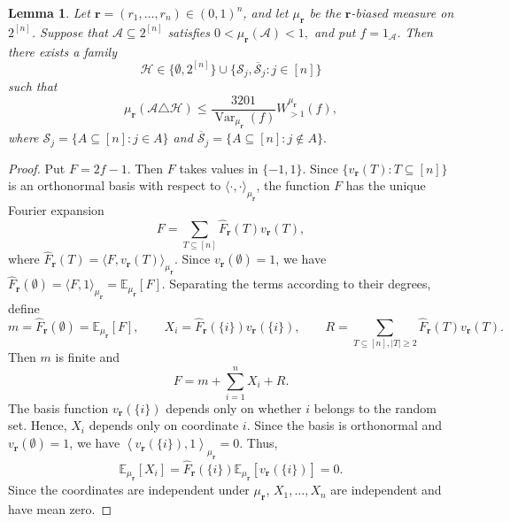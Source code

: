 \documentclass[11pt]{article}
\numberwithin{equation}{section}
\newtheorem{lemma}[theorem]{Lemma}
\theoremstyle{definition}
\theoremstyle{remark}
\begin{document}
\begin{lemma}\label{lem:one-coordinate-approximation}
Let $\mathbf r=(r_1,\ldots,r_n)\in(0,1)^n$, and let
$\mu_{\mathbf r}$ be the $\mathbf r$-biased measure on
$2^{[n]}$. Suppose that $\mathcal A\subseteq2^{[n]}$ satisfies
$
0<\mu_{\mathbf r}(\mathcal A)<1,
$
and put $f=1_{\mathcal A}$. Then there exists a family
$$
\mathcal H\in
\{\emptyset,2^{[n]}\}
\cup
\{\mathcal S_j,\overline{\mathcal S}_j:j\in[n]\}
$$
such that
$$
\mu_{\mathbf r}(\mathcal A\triangle\mathcal H)
\leq
\frac{3201}
{\operatorname{Var}_{\mu_{\mathbf r}}(f)}
W_{>1}^{\mu_{\mathbf r}}(f),
$$
where
$
\mathcal S_j=\{A\subseteq[n]:j\in A\}
$
and
$
\overline{\mathcal S}_j
=\{A\subseteq[n]:j\notin A\}.
$
\end{lemma}

\begin{proof}
Put
$
F=2f-1.
$
Then $F$ takes values in $\{-1,1\}$. Since
$
\{v_{\mathbf r}(T):T\subseteq[n]\}
$
is an orthonormal basis with respect to
$\langle\cdot,\cdot\rangle_{\mu_{\mathbf r}}$, the function $F$ has
the unique Fourier expansion
$$
F
=
\sum_{T\subseteq[n]}
\widehat F_{\mathbf r}(T)v_{\mathbf r}(T),
$$
where
$
\widehat F_{\mathbf r}(T)
=
\langle F,v_{\mathbf r}(T)\rangle_{\mu_{\mathbf r}}.
$
Since $v_{\mathbf r}(\emptyset)=1$, we have
$
\widehat F_{\mathbf r}(\emptyset)
=
\langle F,1\rangle_{\mu_{\mathbf r}}
=
\mathbb E_{\mu_{\mathbf r}}[F].
$
Separating the terms according to their degrees, define
$$
m
=
\widehat F_{\mathbf r}(\emptyset)
=
\mathbb E_{\mu_{\mathbf r}}[F],
\qquad
X_i
=
\widehat F_{\mathbf r}(\{i\})
v_{\mathbf r}(\{i\}),
\qquad 
R
=
\sum_{T\subseteq[n], |T|\geq2}
\widehat F_{\mathbf r}(T)v_{\mathbf r}(T).
$$
Then $m$ is finite and
$$
F=m+\sum_{i=1}^nX_i+R.
$$
The basis function $v_{\mathbf r}(\{i\})$ depends only on whether
$i$ belongs to the random set. Hence, $X_i$ depends only on coordinate
$i$. Since the
basis is orthonormal and 
$v_{\mathbf r}(\emptyset)=1$, we have
$
\left\langle
v_{\mathbf r}(\{i\}),1
\right\rangle_{\mu_{\mathbf r}}
=0.
$
Thus,
$$
\mathbb E_{\mu_{\mathbf r}}[X_i]
=
\widehat F_{\mathbf r}(\{i\})
\mathbb E_{\mu_{\mathbf r}}
[v_{\mathbf r}(\{i\})]
=0.
$$
Since the coordinates are independent under
$\mu_{\mathbf r}$,
$X_1,\ldots,X_n$ are independent and have mean zero.


\end{proof}
\end{document}
